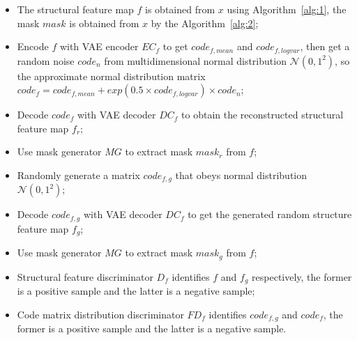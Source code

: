 \documentclass[letterpaper]{article} %
\begin{document}
\begin{itemize}
	\item The structural feature map $f$ is obtained from $x$ using Algorithm~\ref{alg:1}, the mask $mask$ is obtained from $x$ by the Algorithm~\ref{alg:2};
	\item Encode $f$ with VAE encoder $EC_f$ to get $code_{f,mean}$ and $code_{f,logvar}$, then get a random noise $code_n$ from multidimensional normal distribution $\mathcal{N}(0,1^2)$, so the approximate normal distribution matrix  $code_f=code_{f,mean}+exp(0.5\times code_{f,logvar})\times code_n$;
	\item Decode $code_f$ with VAE decoder $DC_f$ to obtain the reconstructed structural feature map $f_r$;
	\item Use mask generator $MG$ to extract mask $mask_r$ from $f$;
	\item Randomly generate a matrix $code_{f,g}$ that obeys normal distribution $\mathcal{N}(0,1^2)$;
	\item Decode $code_{f,g}$ with VAE decoder $DC_f$ to get the generated random structure feature map $f_g$;
	\item Use mask generator $MG$ to extract mask $mask_g$ from $f$;
	\item Structural feature discriminator $D_f$ identifies $f$ and $f_g$ respectively, the former is a positive sample and the latter is a negative sample;
	\item Code matrix distribution discriminator $FD_f$ identifies $code_{f,g}$ and $code_f$, the former is a positive sample and the latter is a negative sample.
\end{itemize}
\end{document}
